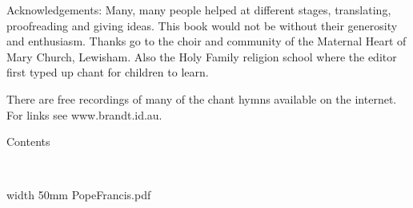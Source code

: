 {%

Acknowledgements:  Many, many people helped at different stages,
translating, proofreading and giving ideas.  This book would not
be without their generosity and enthusiasm.
Thanks go to the choir and community of the Maternal Heart of Mary
Church, Lewisham.  Also the Holy Family 
religion school where the editor first typed up chant for children
to learn. 

There are free recordings of many of the chant hymns available
on the internet.  For links see www.brandt.id.au.



}

\eject

\centerline{\bigtype Contents}

\doubleline

\bigskip

\readtocfile

\vfill

\eject

\vfill
\eject


%






\ 

\vfill


\saveimageresource width 50mm {PopeFrancis.pdf}

\centerline{\useimageresource \lastsavedimageresourceindex}




\vfill


%

